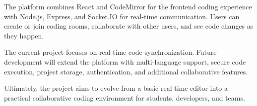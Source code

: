 \documentclass[11pt,letterpaper]{article}
\begin{document}
The platform combines React and CodeMirror for the frontend coding experience with Node.js, Express, and Socket.IO for real-time communication. Users can create or join coding rooms, collaborate with other users, and see code changes as they happen.

The current project focuses on real-time code synchronization. Future development will extend the platform with multi-language support, secure code execution, project storage, authentication, and additional collaborative features.

Ultimately, the project aims to evolve from a basic real-time editor into a practical collaborative coding environment for students, developers, and teams.
\end{document}
